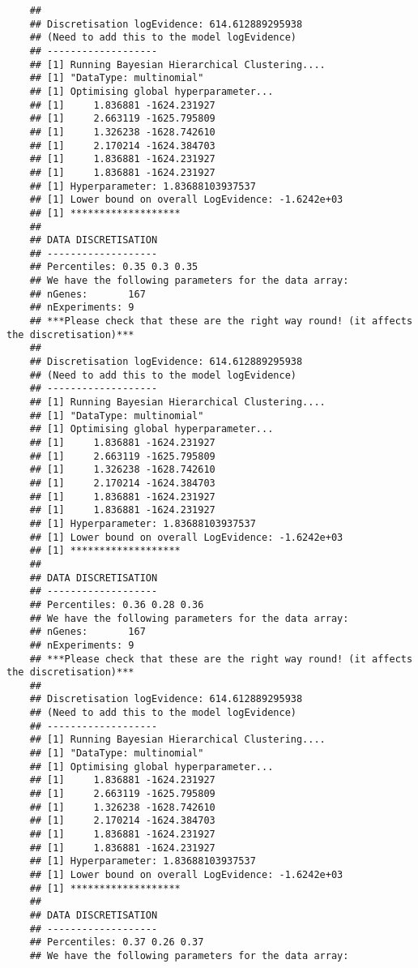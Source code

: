 \begin{verbatim}
    ## 
    ## Discretisation logEvidence: 614.612889295938
    ## (Need to add this to the model logEvidence)
    ## -------------------
    ## [1] Running Bayesian Hierarchical Clustering....
    ## [1] "DataType: multinomial"
    ## [1] Optimising global hyperparameter...
    ## [1]     1.836881 -1624.231927
    ## [1]     2.663119 -1625.795809
    ## [1]     1.326238 -1628.742610
    ## [1]     2.170214 -1624.384703
    ## [1]     1.836881 -1624.231927
    ## [1]     1.836881 -1624.231927
    ## [1] Hyperparameter: 1.83688103937537
    ## [1] Lower bound on overall LogEvidence: -1.6242e+03
    ## [1] *******************
    ## 
    ## DATA DISCRETISATION
    ## -------------------
    ## Percentiles: 0.35 0.3 0.35 
    ## We have the following parameters for the data array:
    ## nGenes:       167
    ## nExperiments: 9
    ## ***Please check that these are the right way round! (it affects the discretisation)***
    ## 
    ## Discretisation logEvidence: 614.612889295938
    ## (Need to add this to the model logEvidence)
    ## -------------------
    ## [1] Running Bayesian Hierarchical Clustering....
    ## [1] "DataType: multinomial"
    ## [1] Optimising global hyperparameter...
    ## [1]     1.836881 -1624.231927
    ## [1]     2.663119 -1625.795809
    ## [1]     1.326238 -1628.742610
    ## [1]     2.170214 -1624.384703
    ## [1]     1.836881 -1624.231927
    ## [1]     1.836881 -1624.231927
    ## [1] Hyperparameter: 1.83688103937537
    ## [1] Lower bound on overall LogEvidence: -1.6242e+03
    ## [1] *******************
    ## 
    ## DATA DISCRETISATION
    ## -------------------
    ## Percentiles: 0.36 0.28 0.36 
    ## We have the following parameters for the data array:
    ## nGenes:       167
    ## nExperiments: 9
    ## ***Please check that these are the right way round! (it affects the discretisation)***
    ## 
    ## Discretisation logEvidence: 614.612889295938
    ## (Need to add this to the model logEvidence)
    ## -------------------
    ## [1] Running Bayesian Hierarchical Clustering....
    ## [1] "DataType: multinomial"
    ## [1] Optimising global hyperparameter...
    ## [1]     1.836881 -1624.231927
    ## [1]     2.663119 -1625.795809
    ## [1]     1.326238 -1628.742610
    ## [1]     2.170214 -1624.384703
    ## [1]     1.836881 -1624.231927
    ## [1]     1.836881 -1624.231927
    ## [1] Hyperparameter: 1.83688103937537
    ## [1] Lower bound on overall LogEvidence: -1.6242e+03
    ## [1] *******************
    ## 
    ## DATA DISCRETISATION
    ## -------------------
    ## Percentiles: 0.37 0.26 0.37 
    ## We have the following parameters for the data array:

\end{verbatim}

